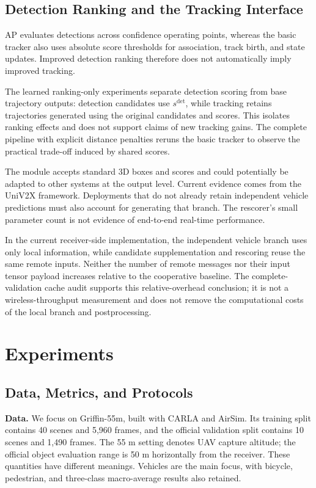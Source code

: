\subsection{Detection Ranking and the Tracking Interface}

AP evaluates detections across confidence operating points, whereas the basic tracker also uses absolute score thresholds for association, track birth, and state updates. Improved detection ranking therefore does not automatically imply improved tracking.

The learned ranking-only experiments separate detection scoring from base trajectory outputs: detection candidates use $s^{\mathrm{det}}$, while tracking retains trajectories generated using the original candidates and scores. This isolates ranking effects and does not support claims of new tracking gains. The complete pipeline with explicit distance penalties reruns the basic tracker to observe the practical trade-off induced by shared scores.

The module accepts standard 3D boxes and scores and could potentially be adapted to other systems at the output level. Current evidence comes from the UniV2X framework. Deployments that do not already retain independent vehicle predictions must also account for generating that branch. The rescorer's small parameter count is not evidence of end-to-end real-time performance.

In the current receiver-side implementation, the independent vehicle branch uses only local information, while candidate supplementation and rescoring reuse the same remote inputs. Neither the number of remote messages nor their input tensor payload increases relative to the cooperative baseline. The complete-validation cache audit supports this relative-overhead conclusion; it is not a wireless-throughput measurement and does not remove the computational costs of the local branch and postprocessing.

\section{Experiments}

\subsection{Data, Metrics, and Protocols}

\textbf{Data.} We focus on Griffin-55m, built with CARLA and AirSim. Its training split contains 40 scenes and 5,960 frames, and the official validation split contains 10 scenes and 1,490 frames. The 55 m setting denotes UAV capture altitude; the official object evaluation range is 50 m horizontally from the receiver. These quantities have different meanings. Vehicles are the main focus, with bicycle, pedestrian, and three-class macro-average results also retained.

